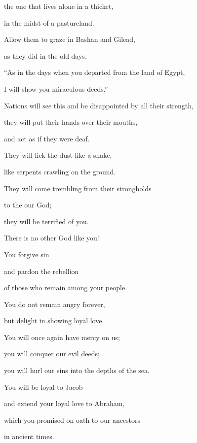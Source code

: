 {\par }{\Q the one that lives
alone
in a thicket,
\par }{\Q in the midst
of a pastureland.
\par }{\Q Allow them to graze
in Bashan
and Gilead,
\par }{\Q as they did in the old
days.
\par }{\Q {}“As in the days
when you departed
from the land
of Egypt,
\par }{\Q I will show
you miraculous deeds.”
\par }{\Q {}Nations
will see
this and be disappointed
by all
their strength,
\par }{\Q they will put
their hands
over
their mouths,
\par }{\Q and act as if they were deaf.
\par }{\Q {}They will lick
the dust
like a snake,
\par }{\Q like serpents
crawling
on the ground.
\par }{\Q They will come trembling from their strongholds
\par }{\Q to
the {}
our God;
\par }{\Q they will be
terrified of you.
\par }{\Q {}There is no
other God
like
you!

\par }{\Q You forgive
sin
\par }{\Q and pardon
the rebellion
\par }{\Q of those who remain
among your people.
\par }{\Q You do not
remain angry
forever,
\par }{\Q but
delight
in showing
loyal love.
\par }{\Q {}You will once again
have mercy
on us;
\par }{\Q you will conquer
our evil deeds;
\par }{\Q you will hurl
our sins
into
the depths
of the sea.
\par }{\Q {}You will
be loyal
to Jacob
\par }{\Q and extend your loyal love
to Abraham,
\par }{\Q which
you promised
on oath to our ancestors
\par }{\PP in ancient
times.
\par }